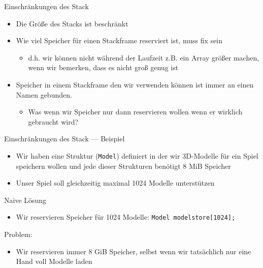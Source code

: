 \documentclass[presentation]{beamer}
\begin{document}
\begin{frame}[label={sec:org0c75b2f}]{Einschränkungen des Stack}
\begin{itemize}
\item Die \alert{Größe} des Stacks ist \alert{beschränkt}
\item \alert{Wie viel Speicher} für einen Stackframe reserviert ist, muss \alert{fix} sein
\begin{itemize}
\item d.h. wir können nicht während der Laufzeit z.B. ein Array größer
machen, wenn wir bemerken, dass es nicht groß genug ist
\end{itemize}
\item Speicher in einem Stackframe den wir verwenden können ist \alert{immer an
einen Namen} gebunden.
\begin{itemize}
\item Was wenn wir Speicher nur dann reservieren wollen wenn er
\alert{wirklich gebraucht wird}?
\end{itemize}
\end{itemize}
\end{frame}
\begin{frame}[label={sec:org7565d54},fragile]{Einschränkungen des Stack --- Beispiel}
 \begin{itemize}
\item Wir haben eine Struktur ({\color{solarizedYellow}\verb!Model!}) definiert in der wir 3D-Modelle
für ein Spiel speichern wollen und jede dieser Strukturen benötigt
8 MiB Speicher
\item Unser Spiel soll gleichzeitig maximal 1024 Modelle unterstützen
\end{itemize}
\begin{exampleblock}{Naive Lösung}
\begin{itemize}
\item Wir reservieren Speicher für 1024 Modelle: {\color{solarizedYellow}\verb!Model modelstore[1024];!}
\end{itemize}
\alert{Problem:}
\begin{itemize}
\item Wir reservieren immer 8 GiB Speicher, selbst wenn wir tatsächlich
nur eine Hand voll Modelle laden
\end{itemize}
\end{exampleblock}
\end{frame}
\end{document}
